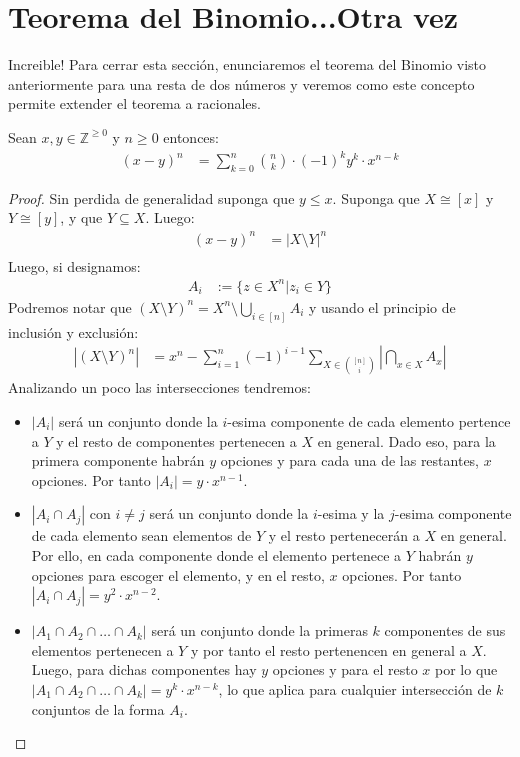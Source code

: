 \documentclass[12pt,a4paper,oneside]{memoir}
\begin{document}
\section*{Teorema del Binomio...Otra vez}
Increible! Para cerrar esta sección, enunciaremos el teorema del Binomio visto anteriormente para una resta de dos números y veremos como este concepto permite extender el teorema a racionales.
\begin{theorem}
    Sean $x, y \in \mathbb{Z}^{\ge 0}$ y $n \ge 0$ entonces:
    \begin{align*}
        (x-y)^n &= \sum_{k = 0}^n \binom{n}{k} \cdot (-1)^k y^k \cdot x^{n-k}
    \end{align*}
\end{theorem}
\begin{proof}
    Sin perdida de generalidad suponga que $y \le x$. Suponga que $X \cong [x]$ y $Y \cong [y]$, y que $Y \subseteq X$. Luego:
    \begin{align*}
        (x-y)^n &= |X \setminus Y|^n\\
    \end{align*}
    Luego, si designamos:
    \begin{align*}
        A_i &:= \{z \in X^n | z_i \in Y\}
    \end{align*}
    Podremos notar que $(X\setminus Y)^n = X^n \setminus \bigcup_{i \in [n]} A_i$ y usando el principio de inclusión y exclusión:
    \begin{align*}
        |(X\setminus Y)^n| &= x^n - \sum_{i = 1}^n (-1)^{i-1} \sum_{X \in \binom{[n]}{i}} \left|\bigcap_{x \in X} A_x\right| 
    \end{align*}
    Analizando un poco las intersecciones tendremos:
    \begin{itemize}
        \item $|A_i|$ será un conjunto donde la $i$-esima componente de cada elemento pertence a $Y$ y el resto de componentes pertenecen a $X$ en general. Dado eso, para la primera componente habrán $y$ opciones y para cada una de las restantes, $x$ opciones. Por tanto $|A_i| = y \cdot x^{n-1}$.
        \item $|A_i \cap A_j|$ con $i \neq j$ será un conjunto donde la $i$-esima y la $j$-esima componente de cada elemento sean elementos de $Y$ y el resto pertenecerán a $X$ en general. Por ello, en cada componente donde el elemento pertenece a $Y$ habrán $y$ opciones para escoger el elemento, y en el resto, $x$ opciones. Por tanto $|A_i \cap A_j| = y^2 \cdot x^{n-2}$.
        \item $|A_1 \cap A_2 \cap \dots \cap A_k|$ será un conjunto donde la primeras $k$ componentes de sus elementos pertenecen a $Y$ y por tanto el resto pertenencen en general a $X$. Luego, para dichas componentes hay $y$ opciones y para el resto $x$ por lo que $|A_1 \cap A_2 \cap \dots \cap A_k| = y^k \cdot x^{n-k}$, lo que aplica para cualquier intersección de $k$ conjuntos de la forma $A_i$.

\end{itemize}
\end{proof}
\end{document}
